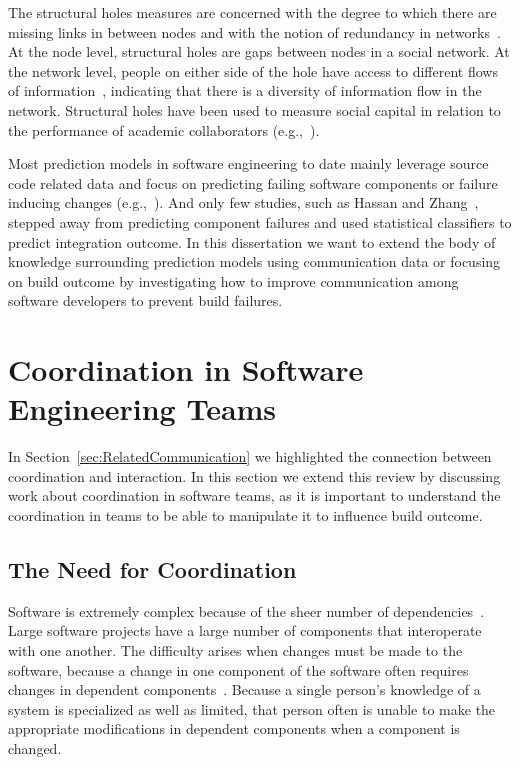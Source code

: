 The structural holes measures are concerned with the degree to which there
are missing links in between nodes and with the notion of redundancy in
networks~\cite{Burt:1995vo}. At the node level, structural holes are gaps between
nodes in a social network. At the network level, people on either side of the
hole have access to different flows of information~\cite{Hargadon:1997asq},
indicating that there is a diversity of information flow in the network.
Structural holes have been used to measure social capital in relation to the
performance of academic collaborators (e.g.,~\cite{Brambila:PICMET2007}).

Most prediction models in software engineering to date mainly leverage source
code related data and focus on predicting failing software components or failure
inducing changes
(e.g.,~\cite{bell:2005tse,schroeter:isese:2006,zimmermann:icse:2008,kim:2008tse}).
And only few studies, such as Hassan and Zhang~\cite{hassan:ase:2006}, stepped away
from predicting component failures and used statistical classifiers to predict
integration outcome.
In this dissertation we want to extend the body of knowledge surrounding prediction models using communication data or focusing on build outcome by investigating how to improve communication among software developers to prevent build failures.



\section{Coordination in Software Engineering Teams}
In Section~\ref{sec:RelatedCommunication} we highlighted the connection between coordination and interaction.
In this section we extend this review by discussing work about coordination in software teams, as it is important to understand the coordination in teams to be able to manipulate it to influence build outcome.

\subsection{The Need for Coordination}
Software is extremely complex because of the sheer number of dependencies~\cite{sawyer2004:teams}.
Large software projects have a large number of components that interoperate with one another.
The difficulty arises when changes must be made to the software, because a change in one component of the software often requires changes in dependent components~\cite{desouza:2008}. Because a single person's knowledge of a system is specialized as well as limited, that person often is unable to make the appropriate modifications in dependent components when a component is changed.

